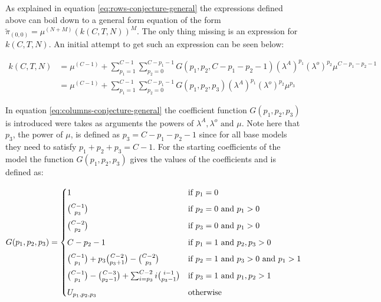\newpage
As explained in equation \ref{eq:rows-conjecture-general} the expressions defined above can boil down to a general form equation of the form \(\tilde{\pi}_{(0,0)} = \mu^{(N+M)} (k(C,T,N))^M\). The only thing missing is an expression for \(k(C,T,N)\). An initial attempt to get such an expression can be seen below:

\begin{align}\label{eq:columns-conjecture-general}
    k(C,T,N) &= \mu^{(C-1)} + \sum_{p_1=1}^{C-1} \sum_{p_2=0}^{C-p_1-1} G(p_1, p_2, C-p_1-p_2-1) (\lambda^A)^{p_1} (\lambda^o)^{p_2} \mu^{C-p_1-p_2-1} \nonumber \\
    &= \mu^{(C-1)} + \sum_{p_1=1}^{C-1} \sum_{p_2=0}^{C-p_1-1} G(p_1, p_2, p_3) (\lambda^A)^{p_1} (\lambda^o)^{p_2} \mu^{p_3}
\end{align}

In equation \ref{eq:columns-conjecture-general} the coefficient function \(G(p_1,p_2,p_3)\) is introduced were takes as arguments the powers of \(\lambda^A, \lambda^o \text{ and } \mu\). Note here that \(p_3\), the power of \(\mu\), is defined as \(p_3=C-p_1-p_2-1\) since for all base models they need to satisfy \(p_1 + p_2 + p_3 = C-1\). For the starting coefficients of the model the function \(G(p_1,p_2,p_3)\) gives the values of the coefficients and is defined as:

\begin{equation} \label{eq:coefficient-function}
    G(p_1,p_2,p_3) = 
    \begin{cases}
        1 & \text{if } p_1 = 0 \vspace{0.2cm} \\
        \binom{C-1}{p_3} & \text{if } p_2 = 0 \text{ and } p_1 > 0 \vspace{0.2cm} \\
        \binom{C-2}{p_2} & \text{if } p_3 = 0 \text{ and } p_1 > 0 \vspace{0.2cm} \\
        C-p_2-1 & \text{if } p_1 = 1 \text{ and } p_2,p_3 > 0 \vspace{0.2cm} \\
        \binom{C-1}{p_1} + p_3 \binom{C-2}{p_3+1} - \binom{C-2}{p_3} & \text{if } p_2 = 1 \text{ and } p_3 > 0 \text{ and } p_1 > 1 \vspace{0.2cm} \\
        \binom{C-1}{p_1} - \binom{C-3}{p_2-1} + \sum_{i=p_3}^{C-2} i \binom{i-1}{p_3 - 1} & \text{if } p_3 = 1 \text{ and } p_1,p_2 > 1 \vspace{0.2cm} \\
        U_{p_1,p_2,p_3} & \text{otherwise}
    \end{cases}
\end{equation}

